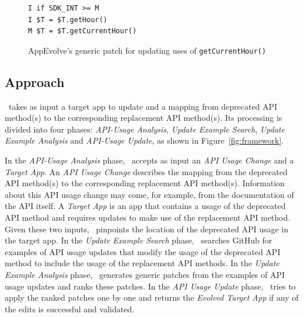 
\begin{figure}[htb]
	\centering
	\begin{lstlisting}[language=text,numbers=none]
I if SDK_INT >= M
I $T = $T.getHour()
M $T = $T.getCurrentHour()
	\end{lstlisting}
	\caption{AppEvolve's generic patch for updating uses of \texttt{getCurrentHour()}}
	\label{fig:deprecated_api_update_edits}
\end{figure}


\subsection{Approach}
\toolname\ takes as input a target app to update and a mapping from
deprecated API method(s) to the corresponding replacement API method(s).
Its processing is divided into four phases: {\em API-Usage Analysis}, {\em
  Update Example Search}, {\em Update Example Analysis} and {\em API-Usage
  Update}, as shown in Figure~\ref{fig:framework}.

In the {\em API-Usage Analysis} phase, \toolname\ accepts as input an {\em
  API Usage Change} and a {\em Target App}. An {\em API Usage Change}
describes the mapping from the deprecated API method(s) to the
corresponding replacement API method(s).  Information about this API usage
change may come, for example, from the documentation of the API itself. A
{\em Target App} is an app that contains a usage of the deprecated API
method and requires updates to make use of the replacement API
method. Given these two inputs, \toolname\ pinpoints the location of the
deprecated API usage in the target app. In the {\em Update Example
  Search} phase, \toolname\ searches GitHub for examples of API usage
updates that modify the usage of the deprecated API method to include the
usage of the replacement API methods. In the {\em Update Example Analysis}
phase, \toolname\ generates generic patches from the examples of API usage
updates and ranks these patches. In the {\em API Usage Update} phase,
\toolname\ tries to apply the ranked patches one by one and returns the
                 {\em Evolved Target App} if any of the edits is successful
                 and validated.

